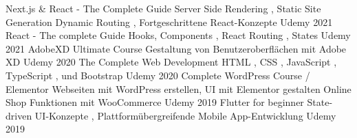 
\begin{cvhonors}
\cvhonor
  {Next.js \& React - The Complete Guide} %
  {Server Side Rendering , Static Site Generation \newline Dynamic Routing , Fortgeschrittene React-Konzepte} %
  {Udemy} %
  {2021} %
\cvhonor
  {React - The complete Guide} %
  {Hooks, Components , React Routing , States} %
  {Udemy} %
  {2021} %
\cvhonor
  {AdobeXD Ultimate Course} %
  {Gestaltung von Benutzeroberflächen mit Adobe XD} %
  {Udemy} %
  {2020} %
\cvhonor
  {The Complete Web Development} %
  {HTML , CSS , JavaScript , TypeScript , und Bootstrap} %
  {Udemy} %
  {2020} %
\cvhonor
  {Complete WordPress Course / Elementor} %
  {Webseiten mit WordPress erstellen, UI mit Elementor gestalten \newline Online Shop Funktionen mit WooCommerce} %
  {Udemy} %
  {2019} %
\cvhonor
  {Flutter for beginner} %
  {State-driven UI-Konzepte , Plattformübergreifende Mobile App-Entwicklung} %
  {Udemy} %
  {2019} %
\end{cvhonors}
